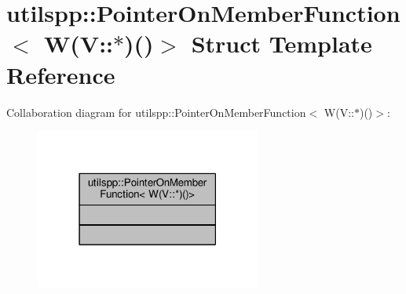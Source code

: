 \hypertarget{structutilspp_1_1PointerOnMemberFunction_3_01W_07V_1_1_5_08_07_08_4}{\section{utilspp\-:\-:Pointer\-On\-Member\-Function$<$ W(V\-:\-:$\ast$)()$>$ Struct Template Reference}
\label{structutilspp_1_1PointerOnMemberFunction_3_01W_07V_1_1_5_08_07_08_4}
}


Collaboration diagram for utilspp\-:\-:Pointer\-On\-Member\-Function$<$ W(V\-:\-:$\ast$)()$>$\-:
\nopagebreak
\begin{figure}[H]
\begin{center}
\leavevmode
\includegraphics[width=210pt]{structutilspp_1_1PointerOnMemberFunction_3_01W_07V_1_1_5_08_07_08_4__coll__graph}
\end{center}
\end{figure}

